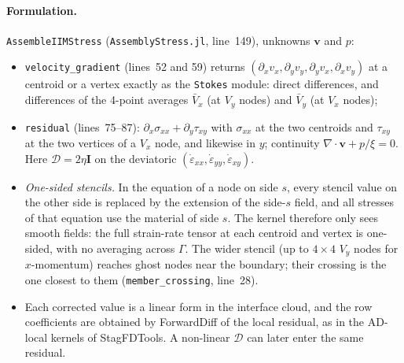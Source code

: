 \documentclass[11pt,a4paper]{article}
\newcommand{\code}[1]{\texttt{#1}}
\begin{document}
\paragraph{Formulation.} \code{AssembleIIMStress} (\code{AssemblyStress.jl}, line~149), unknowns
$\mathbf v$ and $p$:
\begin{itemize}
  \item \code{velocity\_gradient} (lines~52 and 59) returns $(\partial_xv_x,\partial_yv_y,\partial_yv_x,
    \partial_xv_y)$ at a centroid or a vertex exactly as the \code{Stokes} module: direct
    differences, and differences of the 4-point averages $\bar V_x$ (at $V_y$ nodes) and
    $\bar V_y$ (at $V_x$ nodes);
  \item \code{residual} (lines~75--87): $\partial_x\sigma_{xx}+\partial_y\tau_{xy}$ with
    $\sigma_{xx}$ at the two centroids and $\tau_{xy}$ at the two vertices of a $V_x$ node, and
    likewise in $y$; continuity $\nabla\cdot\mathbf v+p/\xi=0$. Here
    $\mathcal D=2\eta\mathbf I$ on the deviatoric $(\dot\varepsilon_{xx},\dot\varepsilon_{yy},
    \dot\varepsilon_{xy})$.
  \item \emph{One-sided stencils.} In the equation of a node on side $s$, every stencil value on
    the other side is replaced by the extension of the side-$s$ field, and all stresses of that
    equation use the material of side $s$. The kernel therefore only sees smooth fields: the
    full strain-rate tensor at each centroid and vertex is one-sided, with no averaging across
    $\Gamma$. The wider stencil (up to $4\times4$ $V_y$ nodes for $x$-momentum) reaches ghost
    nodes near the boundary; their crossing is the one closest to them
    (\code{member\_crossing}, line~28).
  \item Each corrected value is a linear form in the interface cloud, and the row coefficients
    are obtained by ForwardDiff of the local residual, as in the AD-local kernels of
    StagFDTools. A non-linear $\mathcal D$ can later enter the same residual.
\end{itemize}
\end{document}
